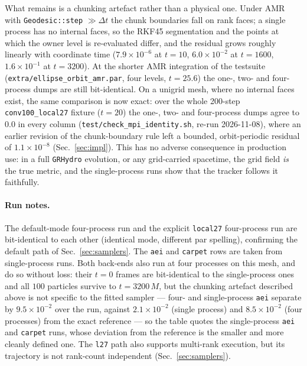 \documentclass[11pt]{article}
\begin{document}
What remains is a chunking artefact rather than a physical one.  Under
AMR with \texttt{Geodesic::step} $\gg \Delta t$ the chunk boundaries fall
on rank faces; a single process has no internal faces, so the RKF45
segmentation and the points at which the owner level is re-evaluated
differ, and the residual grows roughly linearly with coordinate time
($7.9\times10^{-6}$ at $t = 10$, $6.0\times10^{-2}$ at $t = 1600$,
$1.6\times10^{-1}$ at $t = 3200$).  At the shorter AMR integration of the
testsuite (\texttt{extra/ellipse\_orbit\_amr.par}, four levels,
$t = 25.6$) the one-, two- and four-process dumps are still
bit-identical.  On a unigrid mesh, where no internal
faces exist, the same comparison is now exact: over the whole
200-step \texttt{conv100\_local27} fixture ($t = 20$) the one-, two- and
four-process dumps agree to $0.0$ in every column
(\texttt{test/check\_mpi\_identity.sh}, re-run 2026-11-08), where an
earlier revision of the chunk-boundary rule left a bounded,
orbit-periodic residual of $1.1\times10^{-8}$ (Sec.~\ref{sec:impl}).
This has no adverse
consequence in production use: in a full \texttt{GRHydro} evolution, or
any grid-carried spacetime, the grid field \emph{is} the true metric,
and the single-process runs show that the tracker follows it faithfully.

\paragraph{Run notes.}
The default-mode four-process run and the explicit \texttt{local27}
four-process run are bit-identical to each other (identical mode,
different par spelling), confirming the default path of
Sec.~\ref{sec:samplers}.  The \texttt{aei} and \texttt{carpet} rows are
taken from single-process runs.  Both back-ends also run at four
processes on this mesh, and do so without loss: their $t = 0$ frames are
bit-identical to the single-process ones and all $100$ particles survive
to $t = 3200\,M$, but the chunking artefact described above is not
specific to the fitted sampler --- four- and single-process
\texttt{aei} separate by $9.5\times10^{-2}$ over the run, against
$2.1\times10^{-2}$ (single process) and $8.5\times10^{-2}$ (four
processes) from the exact reference ---
so the table quotes the single-process \texttt{aei} and \texttt{carpet}
runs, whose deviation from the reference is the smaller and more cleanly
defined one.  The \texttt{l27} path also supports multi-rank execution,
but its trajectory is not rank-count independent (Sec.~\ref{sec:samplers}).
\end{document}
